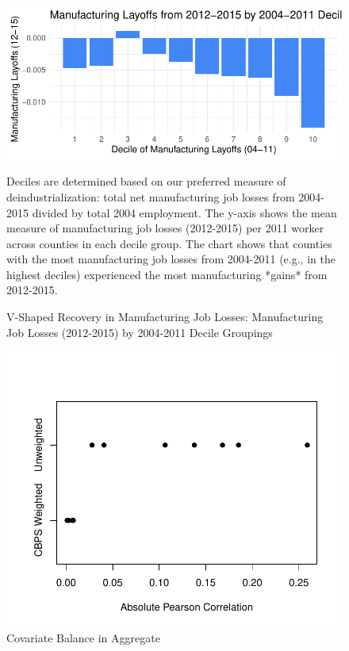 \documentclass[]{AEA}
\begin{document}
\begin{figure} 
\caption{V-Shaped Recovery in Manufacturing Job Losses: Manufacturing Job Losses (2012-2015) by 2004-2011 Decile Groupings}
\label{vShapePlot2}

\begin{center}\includegraphics{Final-Draft_files/figure-latex/unnamed-chunk-11-1} \end{center}



\FloatBarrier

\begin{figurenotes}
Deciles are determined based on our preferred measure of deindustrialization: total net manufacturing job losses from 2004-2015 divided by total 2004 employment. The y-axis shows the mean measure of manufacturing job losses (2012-2015) per 2011 worker across counties in each decile group. The chart shows that counties with the most manufacturing job losses from 2004-2011 (e.g., in the highest deciles) experienced the most manufacturing *gains* from 2012-2015.
\end{figurenotes}
\end{figure}

\begin{figure} 
\caption{Covariate Balance in Aggregate}
\label{balPlot}

\begin{center}\includegraphics{Final-Draft_files/figure-latex/unnamed-chunk-12-1} \end{center}



\FloatBarrier

\end{figure}
\end{document}

